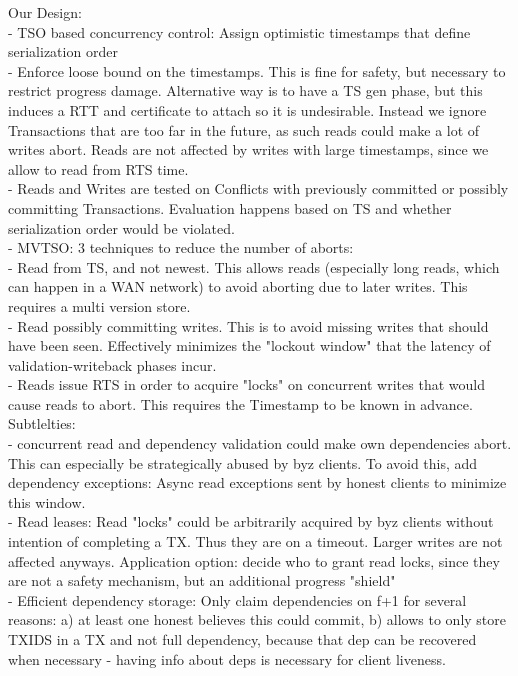 Our Design:\\
- TSO based concurrency control: Assign optimistic timestamps that define serialization order\\
- Enforce loose bound on the timestamps. This is fine for safety, but necessary to restrict progress damage. Alternative way is to have a TS gen phase, but this induces a RTT and certificate to attach so it is undesirable. Instead we ignore Transactions that are too far in the future, as such reads could make a lot of writes abort. Reads are not affected by writes with large timestamps, since we allow to read from RTS time.\\
- Reads and Writes are tested on Conflicts with previously committed or possibly committing Transactions. Evaluation happens based on TS and whether serialization order would be violated.\\
- MVTSO: 3 techniques to reduce the number of aborts:\\
	- Read from TS, and not newest. This allows reads (especially long reads, which can happen in a WAN network) to avoid aborting due to later writes. This requires a multi version store.\\
	- Read possibly committing writes. This is to avoid missing writes that should have been seen. Effectively minimizes the "lockout window" that the latency of validation-writeback phases incur.\\
	- Reads issue RTS in order to acquire "locks" on concurrent writes that would cause reads to abort. This requires the Timestamp to be known in advance. \\
	
Subtlelties:\\
- concurrent read and dependency validation could make own dependencies abort. This can especially be strategically abused by byz clients. To avoid this, add dependency exceptions: Async read exceptions sent by honest clients to minimize this window.\\
- Read leases: Read "locks" could be arbitrarily acquired by byz clients without intention of completing a TX. Thus they are on a timeout. Larger writes are not affected anyways. Application option: decide who to grant read locks, since they are not a safety mechanism, but an additional progress "shield"\\
- Efficient dependency storage: Only claim dependencies on f+1 for several reasons: a) at least one honest believes this could commit, b) allows to only store TXIDS in a TX and not full dependency, because that dep can be recovered when necessary - having info about deps is necessary for client liveness.\\


